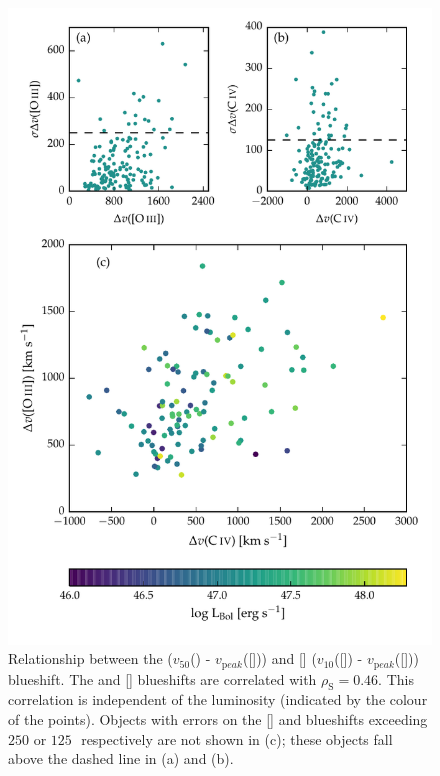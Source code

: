 \begin{figure}
\centering 
    \includegraphics[width=\columnwidth]{figures/chapter04/civ_blueshift_oiii_blueshift.pdf} 
    \caption[{The relation between the blueshifts of  and [].}]{Relationship between the  ($v_{50}$() - $v_{\mathrm peak}$([])) and [] ($v_{10}$([]) - $v_{\mathrm peak}$([])) blueshift.  The  and [] blueshifts are correlated with $\rho_{\mathrm S}=0.46$. This correlation is independent of the luminosity (indicated by the colour of the points). Objects with errors on the [] and  blueshifts exceeding $250$ or $125$\,\kms\, respectively are not shown in (c); these objects fall above the dashed line in (a) and (b). }     
    \label{fig:oiii_civ_blueshifts}
\end{figure}
 
